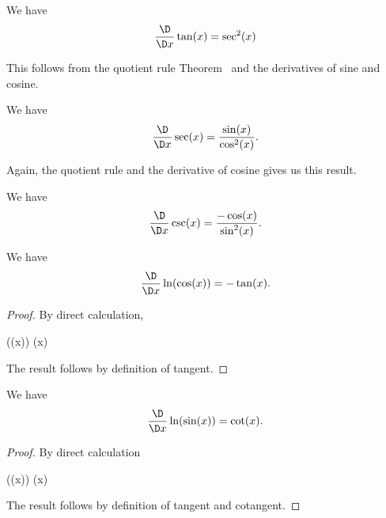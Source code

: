 \begin{theorem}\label{calculus-0011}%
  We have
  \[\frac{\D}{\D x}\tan(x)=\sec^{2}(x)\]
\end{theorem}

This follows from the quotient rule Theorem~ and the
derivatives of sine and cosine.

\begin{node}\label{calculus-0012}%
  We have
  \[\frac{\D}{\D x}\sec(x)=\frac{\sin(x)}{\cos^{2}(x)}.\]
\end{node}

Again, the quotient rule and the derivative of cosine gives us this result.

\begin{node}\label{calculus-0013}%
  We have
  \[\frac{\D}{\D x}\csc(x)=\frac{-\cos(x)}{\sin^{2}(x)}.\]
\end{node}

\begin{node}\label{calculus-0014}%
  We have
  \[\frac{\D}{\D x}\ln(\cos(x))=-\tan(x).\]
\end{node}

\begin{proof}
By direct calculation,
\begin{calculation}
  \ln(\cos(x))
  \cos(x)
\end{calculation}
The result follows by definition of tangent.
\end{proof}

\begin{node}\label{calculus-0015}%
We have
\[\frac{\D}{\D x}\ln(\sin(x))=\cot(x).\]
\end{node}

\begin{proof}
By direct calculation
\begin{calculation}
  \ln(\sin(x))
  \sin(x)
\end{calculation}
The result follows by definition of tangent and cotangent.
\end{proof}

